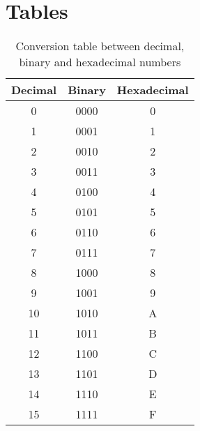 \chapter{Tables}

\begin{table}[h]
    \begin{center}
	\caption{Conversion table between decimal, binary and hexadecimal numbers}
	\label{tab:DecBinHex}

	\bigskip

	\begin{tabular}{ccc}
	\toprule
	    Decimal & Binary & Hexadecimal \\
	\midrule
	     0 & 0000 & 0  \\
	     1 & 0001 & 1 \\
	     2 & 0010 & 2 \\
	     3 & 0011 & 3 \\
	     4 & 0100 & 4 \\
	     5 & 0101 & 5 \\
	     6 & 0110 & 6 \\
	     7 & 0111 & 7 \\
	     8 & 1000 & 8 \\
	     9 & 1001 & 9 \\
	    10 & 1010 & A \\
	    11 & 1011 & B \\
	    12 & 1100 & C \\
	    13 & 1101 & D \\
	    14 & 1110 & E \\
	    15 & 1111 & F \\
	\bottomrule
	\end{tabular}
    \end{center}
\end{table}


